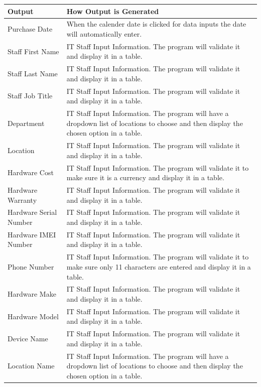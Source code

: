 \begin{center}
    \begin{longtable}{|p{5cm}|p{5cm}|}
        \hline
        \textbf{Output} & \textbf{How Output is Generated}\\ \hline
	Purchase Date & When the calender date is clicked for data inputs the date will automatically enter.\\ \hline
	Staff First Name & IT Staff Input Information. The program will validate it and display it in a table. \\ \hline
	Staff Last Name & IT Staff Input Information. The program will validate it and display it in a table. \\ \hline
	Staff Job Title & IT Staff Input Information. The program will validate it and display it in a table. \\ \hline
	Department & IT Staff Input Information. The program will have a dropdown list of locations to choose and then display the chosen option in a table. \\ \hline
	Location & IT Staff Input Information. The program will validate it and display it in a table. \\ \hline
	Hardware Cost & IT Staff Input Information. The program will validate it to make sure it is a currency and display it in a table. \\ \hline
	Hardware Warranty & IT Staff Input Information. The program will validate it and display it in a table. \\ \hline
	Hardware Serial Number & IT Staff Input Information. The program will validate it and display it in a table. \\ \hline
	Hardware IMEI Number & IT Staff Input Information. The program will validate it and display it in a table. \\ \hline
	Phone Number & IT Staff Input Information. The program will validate it to make sure only 11 characters are entered and display it in a table. \\ \hline
	Hardware Make & IT Staff Input Information. The program will validate it and display it in a table. \\ \hline
	Hardware Model & IT Staff Input Information. The program will validate it and display it in a table. \\ \hline
	Device Name & IT Staff Input Information. The program will validate it and display it in a table. \\ \hline
	Location Name & IT Staff Input Information. The program will have a dropdown list of locations to choose and then display the chosen option in a table.\\ \hline

\end{longtable}
\end{center}
